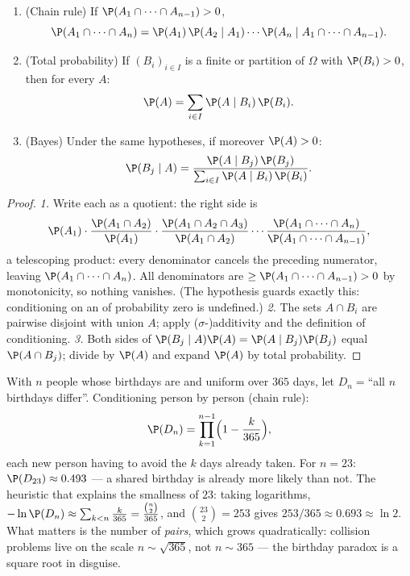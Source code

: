\begin{theorem}\label{thm:b2:proba:bayes}
\leavevmode
\begin{enumerate}
\item (Chain rule) If $\P(A_1 \cap \dots \cap A_{n-1}) > 0$,
\[
\P(A_1 \cap \dots \cap A_n)
= \P(A_1)\,\P(A_2 \mid A_1)\cdots
\P(A_n \mid A_1 \cap \dots \cap A_{n-1}) .
\]
\item (Total probability) If $(B_i)_{i \in I}$ is a finite or
 partition of $\Omega$ with $\P(B_i) > 0$, then for every
 $A$:
\[
\P(A) = \sum_{i \in I} \P(A \mid B_i)\,\P(B_i) .
\]
\item (Bayes) Under the same hypotheses, if moreover $\P(A) > 0$:
\[
\P(B_j \mid A)
= \frac{\P(A \mid B_j)\,\P(B_j)}
       {\sum_{i \in I} \P(A \mid B_i)\,\P(B_i)} .
\]
\end{enumerate}
\end{theorem}

\begin{proof}
\emph{1.} Write each  as a quotient:
the right side is
\[
\P(A_1)\cdot\frac{\P(A_1 \cap A_2)}{\P(A_1)}\cdot
\frac{\P(A_1 \cap A_2 \cap A_3)}{\P(A_1 \cap A_2)}\cdots
\frac{\P(A_1 \cap \dots \cap A_n)}{\P(A_1 \cap \dots \cap
A_{n-1})},
\]
a telescoping product: every denominator cancels the
preceding numerator, leaving $\P(A_1 \cap \dots \cap A_n)$.
All denominators are $\geq \P(A_1 \cap \dots \cap A_{n-1}) >
0$ by monotonicity, so nothing vanishes. (The hypothesis
guards exactly this: conditioning on an  of probability
zero is undefined.)
\emph{2.} The sets $A \cap B_i$ are pairwise disjoint with union
$A$; apply ($\sigma$-)additivity and the definition of
conditioning.
\emph{3.} Both sides of $\P(B_j \mid A)\P(A) = \P(A \mid
B_j)\P(B_j)$ equal $\P(A \cap B_j)$; divide by $\P(A)$ and expand
$\P(A)$ by total probability.
\end{proof}

\begin{example}\label{ex:b2:proba:birthday}
With $n$ people whose birthdays are  and uniform
over $365$ days, let $D_n = {}$``all $n$ birthdays differ''.
Conditioning person by person (chain rule):
\[
\P(D_n) = \prod_{k=1}^{n-1}\Bigl(1 - \frac{k}{365}\Bigr),
\]
each new person having to avoid the $k$ days already taken.
For $n = 23$: $\P(D_{23}) \approx 0.493$ --- a shared
birthday is already more likely than not. The heuristic that
explains the smallness of $23$: taking logarithms, $-\ln
\P(D_n) \approx \sum_{k<n}\frac k{365} =
\frac{\binom n2}{365}$, and $\binom{23}2 = 253$ gives
$253/365 \approx 0.693 \approx \ln 2$. What matters is the
number of \emph{pairs}, which grows quadratically: collision
problems live on the scale $n \sim \sqrt{365}$, not $n \sim
365$ --- the birthday paradox is a square root in disguise.
\end{example}

